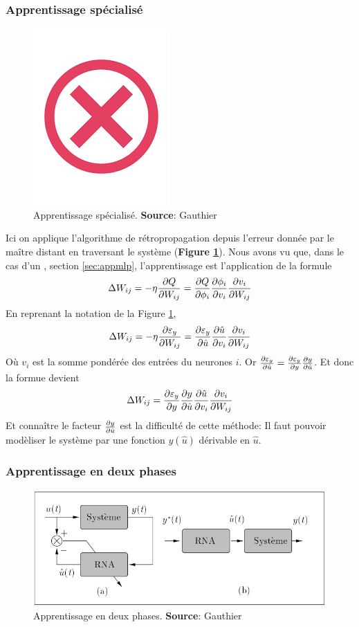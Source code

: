 \subsubsection{Apprentissage spécialisé}\label{sec:appspecial}
\begin{figure}
 \centering
 \includegraphics[scale=0.5]{../figures/invalid.png}
 \caption{Apprentissage spécialisé. \textbf{Source}: Gauthier\cite{Gauthier}}
 \label{appspecialise}
\end{figure}
Ici on applique l'algorithme de rétropropagation depuis l'erreur donnée par le maître distant en traversant le système (\textbf{Figure \ref{appspecialise}}).
Nous avons vu que, dans le cas d'un \mlp, section \ref{sec:appmlp}, l'apprentissage est l'application de la formule \[\Delta W_{ij} = -\eta\frac{\partial Q}{\partial W_{ij}} = \frac{\partial Q}{\partial \phi_i} \frac{\partial \phi_i}{\partial v_i} \frac{\partial v_i}{\partial W_{ij}}\]
En reprenant la notation de la Figure \ref{appspecialise}, \[\Delta W_{ij} = -\eta\frac{\partial \varepsilon_y}{\partial W_{ij}} = \frac{\partial \varepsilon_y}{\partial \hat{u}} \frac{\partial \hat{u}}{\partial v_i} \frac{\partial v_i}{\partial W_{ij}}\]
Où $v_i$ est la somme pondérée des entrées du neurones $i$.
Or $\frac{\partial \varepsilon_y}{\partial \hat{u}} = \frac{\partial \varepsilon_y}{\partial y}\frac{\partial y}{\partial \hat{u}}$. Et donc la formue devient
\[\Delta W_{ij} = \frac{\partial \varepsilon_y}{\partial y} \frac{\partial y}{\partial \hat{u}} \frac{\partial \hat{u}}{\partial v_i} \frac{\partial v_i}{\partial W_{ij}}\]
Et connaître le facteur $\frac{\partial y}{\partial \hat{u}}$ est la difficulté de cette méthode:
Il faut pouvoir modèliser le système par une fonction $y(\hat{u})$ dérivable en $\hat{u}$.

\subsubsection{Apprentissage en deux phases}\label{sec:app2phases}
\begin{figure}
 \centering
 \includegraphics[scale=0.5]{../figures/app2phases.jpg}
 \caption{Apprentissage en deux phases. \textbf{Source}: Gauthier\cite{Gauthier}}
 \label{app2phases}
\end{figure}

